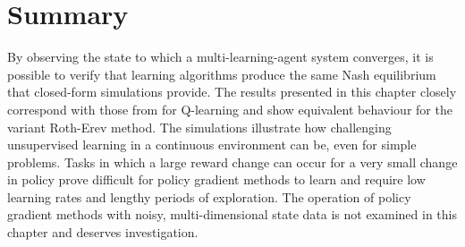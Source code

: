 \section{Summary}
By observing the state to which a multi-learning-agent system converges, it is
possible to verify that learning algorithms produce the same Nash equilibrium
that closed-form simulations provide.  The results presented in this chapter closely
correspond with those from  for Q-learning and show
equivalent behaviour for the variant Roth-Erev method.  The simulations
illustrate how challenging unsupervised learning in a continuous environment can
be, even for simple problems. Tasks in which a large reward change can occur for
a very small change in policy prove difficult for policy gradient methods to
learn and require low learning rates and lengthy periods of exploration.  The
operation of policy gradient methods with noisy, multi-dimensional state data
is not examined in this chapter and deserves investigation.

%



